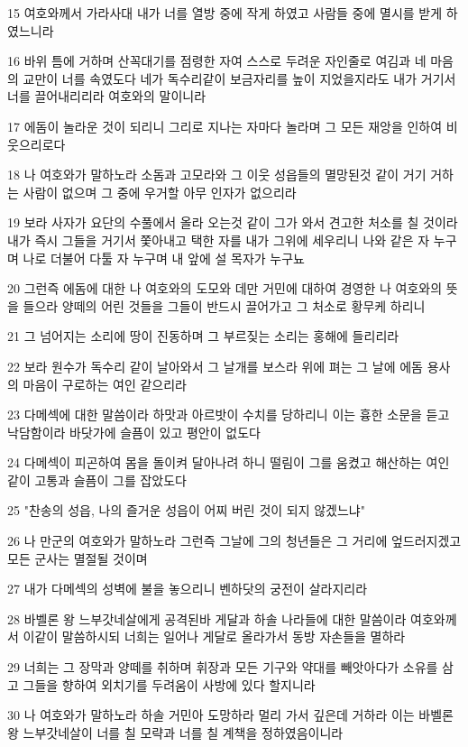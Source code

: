 \par 15 여호와께서 가라사대 내가 너를 열방 중에 작게 하였고 사람들 중에 멸시를 받게 하였느니라
\par 16 바위 틈에 거하며 산꼭대기를 점령한 자여 스스로 두려운 자인줄로 여김과 네 마음의 교만이 너를 속였도다 네가 독수리같이 보금자리를 높이 지었을지라도 내가 거기서 너를 끌어내리리라 여호와의 말이니라
\par 17 에돔이 놀라운 것이 되리니 그리로 지나는 자마다 놀라며 그 모든 재앙을 인하여 비웃으리로다
\par 18 나 여호와가 말하노라 소돔과 고모라와 그 이웃 성읍들의 멸망된것 같이 거기 거하는 사람이 없으며 그 중에 우거할 아무 인자가 없으리라
\par 19 보라 사자가 요단의 수풀에서 올라 오는것 같이 그가 와서 견고한 처소를 칠 것이라 내가 즉시 그들을 거기서 쫓아내고 택한 자를 내가 그위에 세우리니 나와 같은 자 누구며 나로 더불어 다툴 자 누구며 내 앞에 설 목자가 누구뇨
\par 20 그런즉 에돔에 대한 나 여호와의 도모와 데만 거민에 대하여 경영한 나 여호와의 뜻을 들으라 양떼의 어린 것들을 그들이 반드시 끌어가고 그 처소로 황무케 하리니
\par 21 그 넘어지는 소리에 땅이 진동하며 그 부르짖는 소리는 홍해에 들리리라
\par 22 보라 원수가 독수리 같이 날아와서 그 날개를 보스라 위에 펴는 그 날에 에돔 용사의 마음이 구로하는 여인 같으리라
\par 23 다메섹에 대한 말씀이라 하맛과 아르밧이 수치를 당하리니 이는 흉한 소문을 듣고 낙담함이라 바닷가에 슬픔이 있고 평안이 없도다
\par 24 다메섹이 피곤하여 몸을 돌이켜 달아나려 하니 떨림이 그를 움켰고 해산하는 여인 같이 고통과 슬픔이 그를 잡았도다
\par 25 "찬송의 성읍, 나의 즐거운 성읍이 어찌 버린 것이 되지 않겠느냐"
\par 26 나 만군의 여호와가 말하노라 그런즉 그날에 그의 청년들은 그 거리에 엎드러지겠고 모든 군사는 멸절될 것이며
\par 27 내가 다메섹의 성벽에 불을 놓으리니 벤하닷의 궁전이 살라지리라
\par 28 바벨론 왕 느부갓네살에게 공격된바 게달과 하솔 나라들에 대한 말씀이라 여호와께서 이같이 말씀하시되 너희는 일어나 게달로 올라가서 동방 자손들을 멸하라
\par 29 너희는 그 장막과 양떼를 취하며 휘장과 모든 기구와 약대를 빼앗아다가 소유를 삼고 그들을 향하여 외치기를 두려움이 사방에 있다 할지니라
\par 30 나 여호와가 말하노라 하솔 거민아 도망하라 멀리 가서 깊은데 거하라 이는 바벨론 왕 느부갓네살이 너를 칠 모략과 너를 칠 계책을 정하였음이니라
